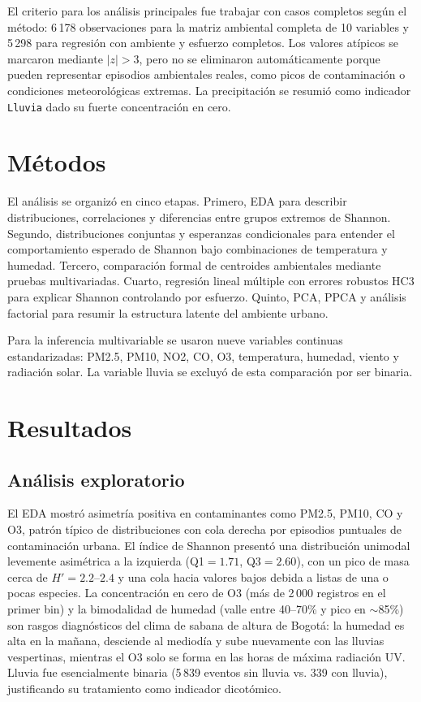 \documentclass[9pt,letterpaper]{article}
\begin{document}
El criterio para los análisis principales fue trabajar con casos completos según el método: 6\,178 observaciones para la matriz ambiental completa de 10 variables y 5\,298 para regresión con ambiente y esfuerzo completos. Los valores atípicos se marcaron mediante $|z|>3$, pero no se eliminaron automáticamente porque pueden representar episodios ambientales reales, como picos de contaminación o condiciones meteorológicas extremas. La precipitación se resumió como indicador \texttt{Lluvia} dado su fuerte concentración en cero.

\section{Métodos}

El análisis se organizó en cinco etapas. Primero, EDA para describir distribuciones, correlaciones y diferencias entre grupos extremos de Shannon. Segundo, distribuciones conjuntas y esperanzas condicionales para entender el comportamiento esperado de Shannon bajo combinaciones de temperatura y humedad. Tercero, comparación formal de centroides ambientales mediante pruebas multivariadas. Cuarto, regresión lineal múltiple con errores robustos HC3 para explicar Shannon controlando por esfuerzo. Quinto, PCA, PPCA y análisis factorial para resumir la estructura latente del ambiente urbano.

Para la inferencia multivariable se usaron nueve variables continuas estandarizadas: PM2.5, PM10, NO2, CO, O3, temperatura, humedad, viento y radiación solar. La variable lluvia se excluyó de esta comparación por ser binaria.

\section{Resultados}

\subsection{Análisis exploratorio}

El EDA mostró asimetría positiva en contaminantes como PM2.5, PM10, CO y O3, patrón típico de distribuciones con cola derecha por episodios puntuales de contaminación urbana. El índice de Shannon presentó una distribución unimodal levemente asimétrica a la izquierda (Q1$=1.71$, Q3$=2.60$), con un pico de masa cerca de $H'=2.2$--$2.4$ y una cola hacia valores bajos debida a listas de una o pocas especies. La concentración en cero de O3 (más de 2\,000 registros en el primer bin) y la bimodalidad de humedad (valle entre 40--70\% y pico en $\sim$85\%) son rasgos diagnósticos del clima de sabana de altura de Bogotá: la humedad es alta en la mañana, desciende al mediodía y sube nuevamente con las lluvias vespertinas, mientras el O3 solo se forma en las horas de máxima radiación UV. Lluvia fue esencialmente binaria (5\,839 eventos sin lluvia vs. 339 con lluvia), justificando su tratamiento como indicador dicotómico.
\end{document}

